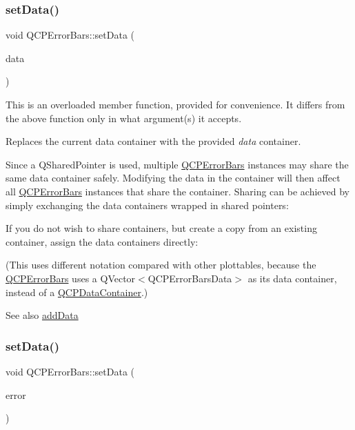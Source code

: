 \subsubsection{\texorpdfstring{set\+Data()}{setData()}\hspace{0.1cm}{\footnotesize\ttfamily [1/3]}}
{\footnotesize\ttfamily void Q\+C\+P\+Error\+Bars\+::set\+Data (\begin{DoxyParamCaption}\item[{Q\+Shared\+Pointer$<$ \hyperlink{class_q_vector}{Q\+C\+P\+Error\+Bars\+Data\+Container} $>$}]{data }\end{DoxyParamCaption})}

This is an overloaded member function, provided for convenience. It differs from the above function only in what argument(s) it accepts.

Replaces the current data container with the provided {\itshape data} container.

Since a Q\+Shared\+Pointer is used, multiple \hyperlink{class_q_c_p_error_bars}{Q\+C\+P\+Error\+Bars} instances may share the same data container safely. Modifying the data in the container will then affect all \hyperlink{class_q_c_p_error_bars}{Q\+C\+P\+Error\+Bars} instances that share the container. Sharing can be achieved by simply exchanging the data containers wrapped in shared pointers\+: 
\begin{DoxyCodeInclude}
\end{DoxyCodeInclude}
 If you do not wish to share containers, but create a copy from an existing container, assign the data containers directly\+: 
\begin{DoxyCodeInclude}
\end{DoxyCodeInclude}
(This uses different notation compared with other plottables, because the \hyperlink{class_q_c_p_error_bars}{Q\+C\+P\+Error\+Bars} uses a {\ttfamily Q\+Vector$<$\+Q\+C\+P\+Error\+Bars\+Data$>$} as its data container, instead of a \hyperlink{class_q_c_p_data_container}{Q\+C\+P\+Data\+Container}.)

\begin{DoxySeeAlso}{See also}
\hyperlink{class_q_c_p_error_bars_aae296ad9817b3fa418db284af81cecf8}{add\+Data} 
\end{DoxySeeAlso}
\mbox{\label{class_q_c_p_error_bars_a2f33d68a7ec163b09017dce3d9d3abcc}} 
\subsubsection{\texorpdfstring{set\+Data()}{setData()}\hspace{0.1cm}{\footnotesize\ttfamily [2/3]}}
{\footnotesize\ttfamily void Q\+C\+P\+Error\+Bars\+::set\+Data (\begin{DoxyParamCaption}\item[{const \hyperlink{class_q_vector}{Q\+Vector}$<$ double $>$ \&}]{error }\end{DoxyParamCaption})}

